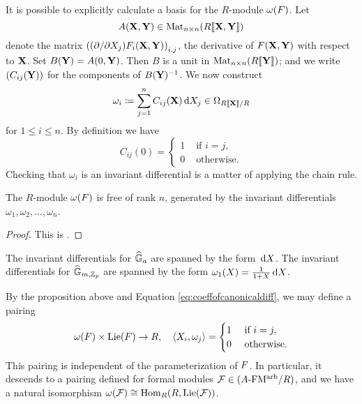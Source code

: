 \documentclass[../main.tex]{subfiles}
\begin{document}
It is possible to explicitly calculate a basis for the $R$-module
$\omega({F})$. Let 
$$A(\mathbf{X}, \mathbf{Y}) \in \operatorname{Mat}_{n \times n} (R\llbracket \mathbf{X}, \mathbf{Y} \rrbracket)$$ 
denote the matrix $\left((\partial/\partial X_j)F_i (\mathbf{X},\mathbf{Y})\right)_{i,j}$,
the derivative of ${F}(\mathbf{X},\mathbf{Y})$ with respect to $\mathbf{X}$. Set 
$B(\mathbf{Y}) = A(0,\mathbf{Y})$. Then $B$ is a unit in $\operatorname{Mat}_{n \times n} (R\llbracket \mathbf{Y} \rrbracket)$; 
and we write $(C_{ij}(\mathbf{Y}))$ for the components of 
$B(\mathbf{Y})^{-1}$. We now construct 
$$\omega_{i} \coloneqq \sum_{j=1}^n C_{ij}(\mathbf{X}) \, \mathrm{d} X_j \in \Omega_{R\llbracket \mathbf{X} \rrbracket/R}$$ 
for $1 \leq i \leq n$. By definition we have 
\begin{equation}\label{eq:coeffofcanonicaldiff}
  C_{ij}(0) = \begin{cases}
    1 &\text{ if }i = j,\\
    0 &\text{ otherwise.}
  \end{cases}
\end{equation}
Checking that $\omega_{i}$ is an invariant differential is a matter of 
applying the chain rule. 
\begin{prop}
    The $R$-module $\omega({F})$ is free of rank $n$, generated by the invariant
    differentials $\omega_{1}, \omega_{2}, \dots, \omega_{n}$.
\begin{proof}
  This is \cite[Proposition 1.1]{honda1970formalgroups}. 
\end{proof}
\end{prop}
\begin{xpl}
  The invariant differentials for $\widehat{\mathbb{G}}_a$ are spanned by the form $\, \mathrm{d} X$. 
  The invariant differentials for $\widehat{\mathbb{G}}_{m, \mathbb{Z}_p}$ are spanned by the form 
  $\omega_1(X) = \frac 1{1+X} \, \mathrm{d} X$.
\end{xpl}
By the proposition above and Equation \eqref{eq:coeffofcanonicaldiff}, we may
define a pairing
\begin{equation*}
  \omega({F}) \times \operatorname{Lie}({F}) \to R, \quad \langle X_i, \omega_j \rangle =
  \begin{cases}
    1 &\text{ if } i = j,\\
    0 &\text{ otherwise.}
  \end{cases}
\end{equation*}
This pairing is independent of the parameterization of ${F}$. In particular, it
descends to a pairing defined for formal modules $\mathcal{F} \in {({A}\textnormal-\allowbreak\mathrm{FM^{arb}}/{R})}$, and
we have a natural isomorphism $\omega(\mathcal{F}) \cong \operatorname{Hom}_R(R, \operatorname{Lie}(\mathcal{F}))$.
\end{document}
